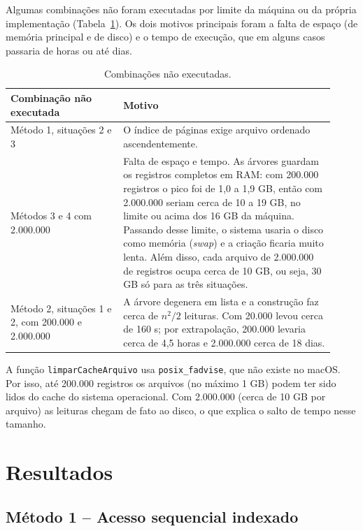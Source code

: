 \documentclass{article}
\begin{document}
Algumas combinações não foram executadas por limite da máquina ou da própria implementação (Tabela~\ref{tab:limites}). Os dois motivos principais foram a falta de espaço (de memória principal e de disco) e o tempo de execução, que em alguns casos passaria de horas ou até dias.

\begin{table}[!htb]
    \centering
    \small
    \begin{tabular}{|p{0.32\linewidth}|p{0.6\linewidth}|}
        \hline\hline
        Combinação não executada & Motivo \\\hline
        Método 1, situações 2 e 3 & O índice de páginas exige arquivo ordenado ascendentemente. \\\hline
        Métodos 3 e 4 com 2.000.000 & Falta de espaço e tempo. As árvores guardam os registros completos em RAM: com 200.000 registros o pico foi de 1,0 a 1,9 GB, então com 2.000.000 seriam cerca de 10 a 19 GB, no limite ou acima dos 16 GB da máquina. Passando desse limite, o sistema usaria o disco como memória (\emph{swap}) e a criação ficaria muito lenta. Além disso, cada arquivo de 2.000.000 de registros ocupa cerca de 10 GB, ou seja, 30 GB só para as três situações. \\\hline
        Método 2, situações 1 e 2, com 200.000 e 2.000.000 & A árvore degenera em lista e a construção faz cerca de $n^2/2$ leituras. Com 20.000 levou cerca de 160 s; por extrapolação, 200.000 levaria cerca de 4,5 horas e 2.000.000 cerca de 18 dias. \\\hline\hline
    \end{tabular}
    \caption{\label{tab:limites}Combinações não executadas.}
\end{table}

A função \texttt{limparCacheArquivo} usa \texttt{posix\_fadvise}, que não existe no macOS. Por isso, até 200.000 registros os arquivos (no máximo 1 GB) podem ter sido lidos do cache do sistema operacional. Com 2.000.000 (cerca de 10 GB por arquivo) as leituras chegam de fato ao disco, o que explica o salto de tempo nesse tamanho.

\clearpage
\section{Resultados}

\subsection{Método 1 -- Acesso sequencial indexado}
\end{document}
